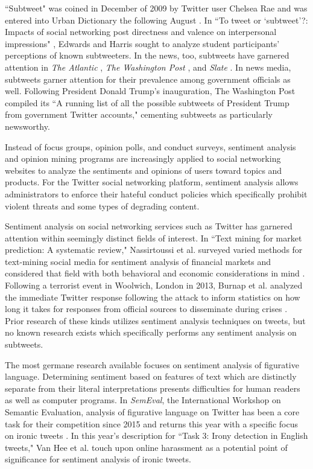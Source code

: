 \documentclass[11pt, twoside, reqno]{book}
\begin{document}
``Subtweet" was coined in December of 2009 by Twitter user Chelsea Rae \cite{first_subtweet} and was entered into Urban Dictionary the following August \cite{urban_dictionary}. In ``To tweet or ‘subtweet’?: Impacts of social networking post directness and valence on interpersonal impressions" \cite{subtweets_communications}, Edwards and Harris sought to analyze student participants' perceptions of known subtweeters. In the news, too, subtweets have garnered attention in \textit{The Atlantic} \cite{the_atlantic}, \textit{The Washington Post} \cite{the_washington_post}, and \textit{Slate} \cite{slate}. In news media, subtweets garner attention for their prevalence among government officials as well. Following President Donald Trump's inauguration, The Washington Post compiled its ``A running list of all the possible subtweets of President Trump from government Twitter accounts," \cite{the_washington_post_trump} cementing subtweets as particularly newsworthy.

Instead of focus groups, opinion polls, and conduct surveys, sentiment analysis and opinion mining programs are increasingly applied to social networking websites to analyze the sentiments and opinions of users toward topics and products. For the Twitter social networking platform, sentiment analysis allows administrators to enforce their hateful conduct policies \cite{hateful_conduct} which specifically prohibit violent threats and some types of degrading content. 

Sentiment analysis on social networking services such as Twitter has garnered attention within seemingly distinct fields of interest. In ``Text mining for market prediction: A systematic review," Nassirtoussi et al. surveyed varied methods for text-mining social media for sentiment analysis of financial markets and considered that field with both behavioral and economic considerations in mind \cite{sentiment_analysis_markets}. Following a terrorist event in Woolwich, London in 2013, Burnap et al. analyzed the immediate Twitter response following the attack to inform statistics on how long it takes for responses from official sources to disseminate during crises \cite{sentiment_analysis_terrorism}. Prior research of these kinds utilizes sentiment analysis techniques on tweets, but no known research exists which specifically performs any sentiment analysis on subtweets. 

The most germane research available focuses on sentiment analysis of figurative language. Determining sentiment based on features of text which are distinctly separate from their literal interpretations presents difficulties for human readers as well as computer programs. In \textit{SemEval}, the International Workshop on Semantic Evaluation, analysis of figurative language on Twitter has been a core task for their competition since 2015 \cite{semeval_2015} and returns this year with a specific focus on ironic tweets \cite{semeval_2018}. In this year's description for ``Task 3: Irony detection in English tweets," Van Hee et al. touch upon online harassment as a potential point of significance for sentiment analysis of ironic tweets. 
\end{document}
